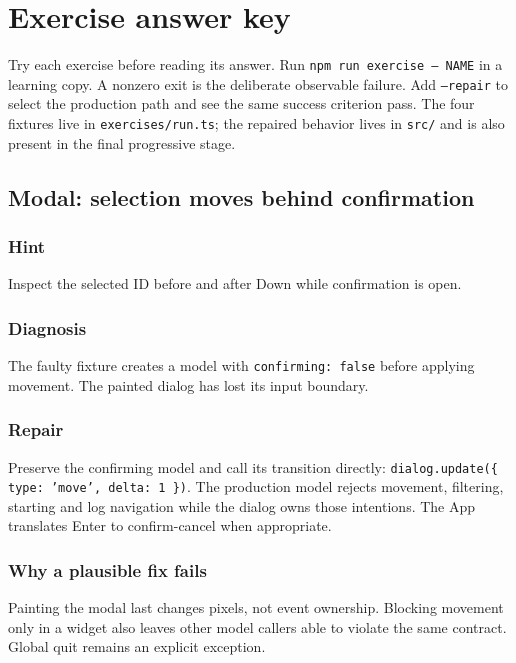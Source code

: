 \chapter{Exercise answer key}\label{exercise-answers}

Try each exercise before reading its answer. Run \texttt{npm run exercise -- NAME} in a learning copy. A nonzero exit is the deliberate observable failure. Add \texttt{--repair} to select the production path and see the same success criterion pass. The four fixtures live in \texttt{exercises/run.ts}; the repaired behavior lives in \texttt{src/} and is also present in the final progressive stage.

\section{Modal: selection moves behind confirmation}

\subsection{Hint}

Inspect the selected ID before and after Down while confirmation is open.

\subsection{Diagnosis}

The faulty fixture creates a model with \texttt{confirming: false} before applying movement. The painted dialog has lost its input boundary.

\subsection{Repair}

Preserve the confirming model and call its transition directly: \texttt{dialog.update(\{ type: 'move', delta: 1 \})}. The production model rejects movement, filtering, starting and log navigation while the dialog owns those intentions. The App translates Enter to confirm-cancel when appropriate.

\subsection{Why a plausible fix fails}

Painting the modal last changes pixels, not event ownership. Blocking movement only in a widget also leaves other model callers able to violate the same contract. Global quit remains an explicit exception.


